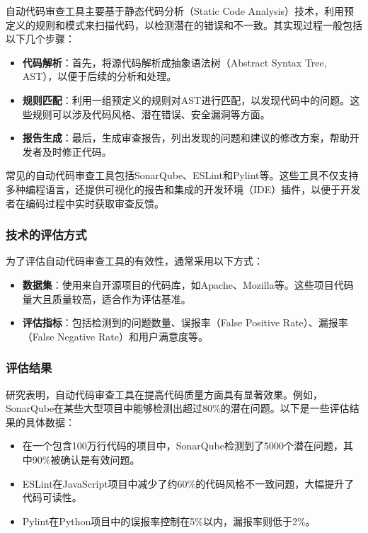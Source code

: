 \documentclass{article}
\begin{document}
自动代码审查工具主要基于静态代码分析（Static Code Analysis）技术，利用预定义的规则和模式来扫描代码，以检测潜在的错误和不一致。其实现过程一般包括以下几个步骤：

\begin{itemize}
    \item \textbf{代码解析}：首先，将源代码解析成抽象语法树（Abstract Syntax Tree, AST），以便于后续的分析和处理。
    \item \textbf{规则匹配}：利用一组预定义的规则对AST进行匹配，以发现代码中的问题。这些规则可以涉及代码风格、潜在错误、安全漏洞等方面。
    \item \textbf{报告生成}：最后，生成审查报告，列出发现的问题和建议的修改方案，帮助开发者及时修正代码。
\end{itemize}

常见的自动代码审查工具包括SonarQube、ESLint和Pylint等。这些工具不仅支持多种编程语言，还提供可视化的报告和集成的开发环境（IDE）插件，以便于开发者在编码过程中实时获取审查反馈。

\subsubsection{技术的评估方式}

为了评估自动代码审查工具的有效性，通常采用以下方式：

\begin{itemize}
    \item \textbf{数据集}：使用来自开源项目的代码库，如Apache、Mozilla等。这些项目代码量大且质量较高，适合作为评估基准。
    \item \textbf{评估指标}：包括检测到的问题数量、误报率（False Positive Rate）、漏报率（False Negative Rate）和用户满意度等。
\end{itemize}

\subsubsection{评估结果}

研究表明，自动代码审查工具在提高代码质量方面具有显著效果。例如，SonarQube在某些大型项目中能够检测出超过80\%的潜在问题。以下是一些评估结果的具体数据：

\begin{itemize}
    \item 在一个包含100万行代码的项目中，SonarQube检测到了5000个潜在问题，其中90\%被确认是有效问题。
    \item ESLint在JavaScript项目中减少了约60\%的代码风格不一致问题，大幅提升了代码可读性。
    \item Pylint在Python项目中的误报率控制在5\%以内，漏报率则低于2\%。
\end{itemize}
\end{document}
